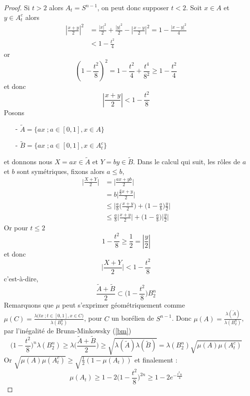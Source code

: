 \documentclass[12pt]{article}
\theoremstyle{definition}
\begin{document}
\begin{proof}
	Si $t>2$ alors $A_t=S^{n-1}$, on peut donc supposer $t<2$. Soit $x\in A$ et $y\in A^{c}_t$ alors \begin{align*}
	\left|\frac{x+y}{2}\right|^2&=\frac{|x|^2}{2}+\frac{|y|^2}{2}-\left|\frac{x-y}{2}\right|^2=1-\frac{|x-y|^2}{4}\\
	&< 1-\frac{t^2}{4}
	\end{align*}
	or 
	\begin{equation*}
	(1-\frac{t^2}{8})^2 =1-\frac{t^2}{4}+\frac{t^4}{8^2}\geq 1-\frac{t^2}{4}
	\end{equation*}
	et donc 
	\begin{equation*}
	\left|\frac{x+y}{2}\right|< 1-\frac{t^2}{8}
	\end{equation*}
	Posons \begin{enumerate}
		\item[-] $\tilde{A}=\big\{ax\;; a\in[0,1], x\in A\big\}$ 
		\item[-]  $\tilde{B}=\big\{ax\;; a\in[0,1], x\in A_t^c\big\}$
	\end{enumerate} 
	et donnons nous $X=ax\in \tilde{A}$ et $Y=by\in \tilde{B}$. Dans le calcul qui suit, les rôles de $a$ et $b$ sont symétriques, fixons alors $a\leq b$,
	\begin{align*}
	\Big|\frac{X+Y}{2}\Big|&= \Big|\frac{ax+yb}{2}\Big|\\
	&=b\Big|\frac{\frac{a}{b}x+y}{2}\Big|\\
	&\leq \Big|\frac{a}{b}\big(\frac{x+y}{2}\big)+\big(1-\frac{a}{b}\big)\frac{y}{2}\Big|\\
	&\leq \frac{a}{b}\Big|\frac{x+y}{2}\Big|+\big(1-\frac{a}{b}\big)\big|\frac{y}{2}\big|
	\end{align*}
	Or pour $t\leq 2$
	\begin{equation*}
	1-\frac{t^2}{8}\geq \frac{1}{2} = |\frac{y}{2}|
	\end{equation*}
	et donc 
	\begin{equation*}
	\Big|\frac{X+Y}{2}\Big|< 1-\frac{t^2}{8}
	\end{equation*}
	c'est-à-dire,
	\begin{equation*}
	\frac{\tilde{A}+\tilde{B}}{2}\subset \big(1-\frac{t^2}{8}\big)B^n_2
	\end{equation*}
	Remarquons que $\mu$ peut s'exprimer géométriquement comme $\mu(C)=\frac{\lambda\big(tx \; ; t\in[0,1], x\in C \big)}{\lambda(B^n_2)}$, pour $C$ un borélien de $S^{n-1}$. Donc $\mu(A)=\frac{\lambda(\tilde{A})}{\lambda(B^n_2)}$, par l'inégalité de Brunn-Minkowsky (\cref{bm})
	\begin{equation*}
	\big(1-\frac{t^2}{8}\big)^{n}\lambda(B^n_2)\geq \lambda\big(\frac{\tilde{A}+\tilde{B}}{2}\big)\geq \sqrt{\lambda(\tilde{A})\lambda(\tilde{B})}=\lambda(B^n_2)\sqrt{\mu(A)\mu(A_t^c)}
	\end{equation*}
	Or $\sqrt{\mu(A)\mu(A_t^c)}\geq\sqrt{\frac{1}{2}(1-\mu(A_t))}$ et finalement :
	\begin{equation*}
	\mu(A_t)\geq 1 - 2 \big(1-\frac{t^2}{8}\big)^{2n}\geq 1 - 2 e^{-\frac{t^2n}{4}}
	\end{equation*}
\end{proof}
\end{document}
